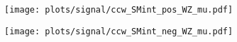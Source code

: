 \begin{figure}[b]
	\centering
	\begin{subfigure}{0.49\textwidth}
		\texttt{[image: plots/signal/ccw\_SMint\_pos\_WZ\_mu.pdf]}
		\caption{}
	\end{subfigure}
	\begin{subfigure}{0.49\textwidth}
		\texttt{[image: plots/signal/ccw\_SMint\_neg\_WZ\_mu.pdf]}
		\caption{}
	\end{subfigure}
	\caption{}
	\label{smintverif_WZ_mu}
\end{figure}